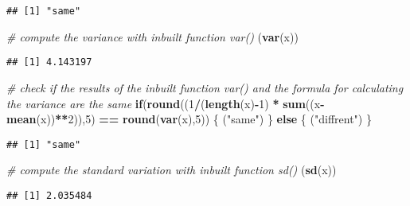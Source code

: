 \documentclass[
]{article}
\newenvironment{Shaded}{\begin{snugshade}}{\end{snugshade}}
\newcommand{\CommentTok}[1]{\textcolor[rgb]{0.56,0.35,0.01}{\textit{#1}}}
\newcommand{\ControlFlowTok}[1]{\textcolor[rgb]{0.13,0.29,0.53}{\textbf{#1}}}
\newcommand{\DecValTok}[1]{\textcolor[rgb]{0.00,0.00,0.81}{#1}}
\newcommand{\KeywordTok}[1]{\textcolor[rgb]{0.13,0.29,0.53}{\textbf{#1}}}
\newcommand{\NormalTok}[1]{#1}
\newcommand{\OperatorTok}[1]{\textcolor[rgb]{0.81,0.36,0.00}{\textbf{#1}}}
\newcommand{\StringTok}[1]{\textcolor[rgb]{0.31,0.60,0.02}{#1}}
\begin{document}
\begin{verbatim}
## [1] "same"
\end{verbatim}

\begin{Shaded}
\begin{Highlighting}[]
\CommentTok{# compute the variance with inbuilt function var()}
\NormalTok{(}\KeywordTok{var}\NormalTok{(x))}
\end{Highlighting}
\end{Shaded}

\begin{verbatim}
## [1] 4.143197
\end{verbatim}

\begin{Shaded}
\begin{Highlighting}[]
\CommentTok{# check if the results of the inbuilt function var() and the formula for calculating the variance are the same }
\ControlFlowTok{if}\NormalTok{(}\KeywordTok{round}\NormalTok{((}\DecValTok{1}\OperatorTok{/}\NormalTok{(}\KeywordTok{length}\NormalTok{(x)}\OperatorTok{-}\DecValTok{1}\NormalTok{) }\OperatorTok{*}\StringTok{ }\KeywordTok{sum}\NormalTok{((x}\OperatorTok{-}\KeywordTok{mean}\NormalTok{(x))}\OperatorTok{**}\DecValTok{2}\NormalTok{)),}\DecValTok{5}\NormalTok{) }\OperatorTok{==}\StringTok{ }\KeywordTok{round}\NormalTok{(}\KeywordTok{var}\NormalTok{(x),}\DecValTok{5}\NormalTok{)) \{}
\NormalTok{  (}\StringTok{"same"}\NormalTok{)}
\NormalTok{\} }\ControlFlowTok{else}\NormalTok{ \{}
\NormalTok{  (}\StringTok{"diffrent"}\NormalTok{)}
\NormalTok{\}}
\end{Highlighting}
\end{Shaded}

\begin{verbatim}
## [1] "same"
\end{verbatim}

\begin{Shaded}
\begin{Highlighting}[]
\CommentTok{# compute the standard variation with inbuilt function sd()}
\NormalTok{(}\KeywordTok{sd}\NormalTok{(x))}
\end{Highlighting}
\end{Shaded}

\begin{verbatim}
## [1] 2.035484
\end{verbatim}
\end{document}
